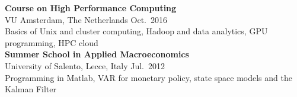 \documentclass[margin,line]{resume}
\begin{document}
\begin{resume}
	\textbf{Course on High Performance Computing}\\
        VU Amsterdam, The Netherlands \hfill Oct.\ 2016\\
        Basics of Unix and cluster computing,  Hadoop and data analytics, GPU programming, HPC cloud\vspace{1.5mm} \\
%   
%
%   
%   
%
%
        \textbf{Summer School in Applied Macroeconomics}\\
        University of Salento, Lecce, Italy \hfill Jul.\ 2012\\
        Programming in Matlab,  VAR for monetary policy, state space models and the Kalman Filter%
 

\end{resume}
\end{document}
